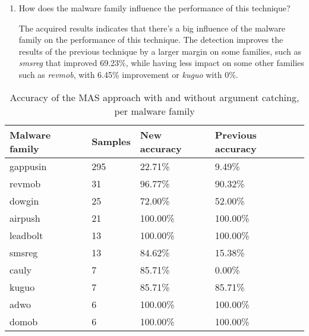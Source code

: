 \begin{enumerate}
    \item How does the malware family influence the performance of this technique?

    The acquired results indicates that there's a big influence of the malware family on the performance of this technique. The detection improves the results of the previous technique by a larger margin on some families, such as \textit{smsreg} that improved 69.23\%, while having less impact on some other families such as \textit{revmob}, with 6.45\% improvement or \textit{kuguo} with 0\%.
\end{enumerate}


\begin{table}[]
\centering
\caption{Accuracy of the MAS approach with and without argument catching, per malware family}
\label{tab:per-family-results}
\begin{tabular}{|l|l|l|l|}
\hline
\textbf{Malware family} & \textbf{Samples} & \textbf{New accuracy} & \textbf{Previous accuracy} \\ \hline
gappusin                & 295              & 22.71\%               & 9.49\%                     \\ \hline
revmob                  & 31               & 96.77\%               & 90.32\%                    \\ \hline
dowgin                  & 25               & 72.00\%               & 52.00\%                    \\ \hline
airpush                 & 21               & 100.00\%              & 100.00\%                   \\ \hline
leadbolt                & 13               & 100.00\%              & 100.00\%                   \\ \hline
smsreg                  & 13               & 84.62\%               & 15.38\%                    \\ \hline
cauly                   & 7                & 85.71\%               & 0.00\%                     \\ \hline
kuguo                   & 7                & 85.71\%               & 85.71\%                    \\ \hline
adwo                    & 6                & 100.00\%              & 100.00\%                   \\ \hline
domob                   & 6                & 100.00\%              & 100.00\%                   \\ \hline

\end{tabular}
\end{table}
